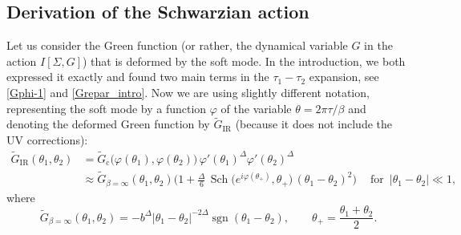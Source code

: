 \documentclass[12pt]{article}
\DeclareMathOperator{\sgn}{sgn}
\DeclareMathOperator{\Sch}{Sch}
\newcommand{\cc}{\mathrm{c}}
\newcommand{\IR}{\text{IR}}
\newcommand{\tG}{\widetilde{G}}
\newcommand{\vp}{\varphi}
\begin{document}
\subsection{Derivation of the Schwarzian action} \label{sec: Schw_der}

Let us consider the Green function (or rather, the dynamical variable $G$ in the action $I[\Sigma,G]$) that is deformed by the soft mode. In the introduction, we both expressed it exactly and found two main terms in the $\tau_1-\tau_2$ expansion, see \eqref{Gphi-1} and \eqref{Grepar_intro}. Now we are using slightly different notation, representing the soft mode by a function $\vp$ of the variable $\theta=2\pi\tau/\beta$ and denoting the deformed Green function by $\tG_{\IR}$ (because it does not include the UV corrections):
\begin{equation}
\begin{aligned}
\tG_{\IR}(\theta_1,\theta_2)
&=\tG_{\cc}\bigl(\vp(\theta_1),\vp(\theta_2)\bigr)\,
\vp'(\theta_1)^{\Delta}\vp'(\theta_2)^{\Delta}\\[3pt]
\label{Grepar}
&\approx \tG_{\beta=\infty}(\theta_1,\theta_2)
\biggl(1+\frac{\Delta}{6}\,
\Sch\bigl(e^{i\vp \left( \theta_+ \right)},\theta_+\bigr)\,(\theta_1-\theta_2)^2\biggr)\quad\:
\text{for }\, |\theta_1-\theta_2|\ll 1,
\end{aligned}
\end{equation}
where
\begin{equation}
\tG_{\beta=\infty}(\theta_1,\theta_2)
=-b^{\Delta} |\theta_1-\theta_2|^{-2\Delta}\sgn(\theta_1-\theta_2),\qquad
\theta_+=\frac{\theta_1+\theta_2}{2}.
\end{equation}
\end{document}
